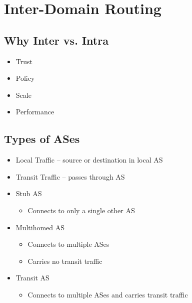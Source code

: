 \section{Inter-Domain Routing}
\subsection{Why Inter vs. Intra}
\begin{itemize}[nosep]
    \item Trust
    \item Policy
    \item Scale
    \item Performance
\end{itemize}
\subsection{Types of ASes}
\begin{itemize}[nosep]
    \item Local Traffic -- source or destination in local AS
    \item Transit Traffic -- passes through AS
    \item Stub AS
          \begin{itemize}[nosep]
              \item Connects to only a single other AS
          \end{itemize}
    \item Multihomed AS
          \begin{itemize}[nosep]
              \item Connects to multiple ASes
              \item Carries no transit traffic
          \end{itemize}
    \item Transit AS
          \begin{itemize}[nosep]
              \item Connects to multiple ASes and carries transit traffic
          \end{itemize}
\end{itemize}
